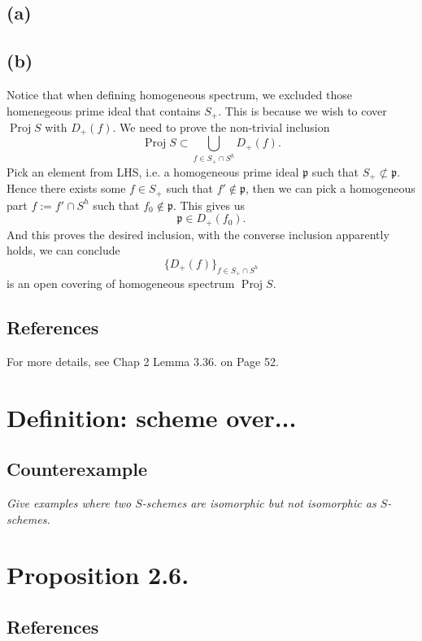 \subsection{(a)}

\subsection{(b)}

Notice that when defining homogeneous spectrum, we excluded those homenegeous prime ideal that contains $S_+$. This is because we wish to cover $\operatorname{Proj}S$ with $D_+(f)$. We need to prove the non-trivial inclusion 
\[\operatorname{Proj}S\subset \bigcup_{f\in S_+\cap S^h}D_+(f).\]
Pick an element from LHS, i.e. a homogeneous prime ideal $\mathfrak p$ such that $S_+\not\subset \mathfrak p$. Hence there exists some $f\in S_+$ such that $f'\notin \mathfrak p$, then we can pick a homogeneous part $f:=f'\cap S^h$ such that $f_0\notin \mathfrak p$. This gives us 
\[\mathfrak p\in D_+(f_0).\]
And this proves the desired inclusion, with the converse inclusion apparently holds, we can conclude 
\[\{D_+(f)\}_{f\in S_+\cap S^h}\] is an open covering of homogeneous spectrum $\operatorname{Proj}S$.

\subsection{References}

For more details, see \cite{qing2006algebraic} Chap 2 Lemma 3.36. on Page 52.

\section{Definition: scheme over...}

\subsection{Counterexample}
\textit{Give examples where two $S$-schemes are isomorphic but not isomorphic as $S$-schemes.}


\section{Proposition 2.6.}

\subsection{References}

